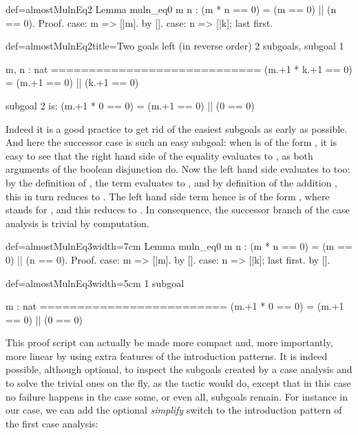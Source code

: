 \begin{coq}{def=almostMulnEq2}{}
Lemma muln_eq0 m n : (m * n == 0) = (m == 0) || (n == 0).
Proof.
case: m => [|m].
  by [].
case: n => [|k]; last first.
\end{coq}
\begin{coqout}{def=almostMulnEq2}{title=Two goals left (in reverse order)}
2 subgoals, subgoal 1

m, n : nat
============================
(m.+1 * k.+1 == 0) = (m.+1 == 0) || (k.+1 == 0)

subgoal 2 is:
 (m.+1 * 0 == 0) = (m.+1 == 0) || (0 == 0)
\end{coqout}
Indeed it is a good practice to get rid of the easiest subgoals as
early as possible. And here the successor case is such an easy
subgoal: when  is of the form , it is easy to see that the
right hand side of the equality evaluates to , as both
arguments of the boolean disjunction do. Now the left hand side
evaluates to  too: by the definition of , the term
 evaluates to , and by
definition of the addition , this in turn reduces to
. The left hand side term hence is of the form
, where  stands for , and this
reduces to .\label{proof:mulneq0}
In consequence, the successor branch of the case analysis is trivial
by computation.


\begin{coq}{def=almostMulnEq3}{width=7cm}
Lemma muln_eq0 m n :
  (m * n == 0) = (m == 0) || (n == 0).
Proof.
case: m => [|m].
  by [].
case: n => [|k]; last first.
  by [].
\end{coq}
\begin{coqout}{def=almostMulnEq3}{width=5cm}
1 subgoal

m : nat
=========================
(m.+1 * 0 == 0) =
  (m.+1 == 0) || (0 == 0)
\end{coqout}

This proof script can actually be made more compact and, more
importantly, more linear by using extra features of the introduction
patterns. It is indeed possible, although optional, to
inspect the subgoals created by a case analysis and to solve the
trivial ones on the fly, as the  tactic would do, except that
in this case no failure happens in the case some, or even all,
subgoals remain. For instance in our case,
we can add the optional \C{//} \emph{simplify} switch to the
introduction pattern of the first case analysis:


